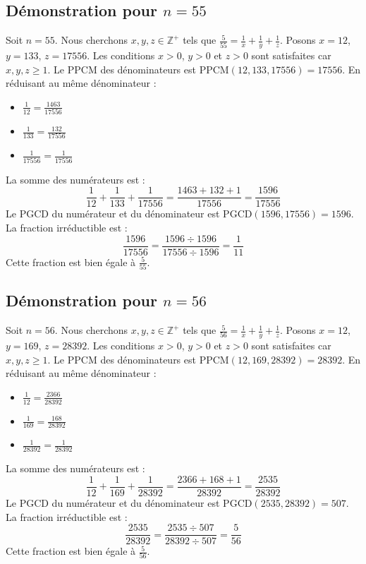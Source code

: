 \documentclass[11pt,a4paper]{article}
\begin{document}
\subsection{Démonstration pour $n = 55$}
Soit $n = 55$. Nous cherchons $x, y, z \in \mathbb{Z}^{+}$ tels que $\frac{5}{55} = \frac{1}{x} + \frac{1}{y} + \frac{1}{z}$.
Posons $x = 12$, $y = 133$, $z = 17556$.
Les conditions $x > 0$, $y > 0$ et $z > 0$ sont satisfaites car $x, y, z \geq 1$.
Le PPCM des dénominateurs est $\text{PPCM}(12, 133, 17556) = 17556$.
En réduisant au même dénominateur :
\begin{itemize}
    \item $\frac{1}{12} = \frac{1463}{17556}$
    \item $\frac{1}{133} = \frac{132}{17556}$
    \item $\frac{1}{17556} = \frac{1}{17556}$
\end{itemize}
La somme des numérateurs est :
$$ \frac{1}{12} + \frac{1}{133} + \frac{1}{17556} = \frac{1463 + 132 + 1}{17556} = \frac{1596}{17556} $$
Le PGCD du numérateur et du dénominateur est $\text{PGCD}(1596, 17556) = 1596$.
La fraction irréductible est :
$$ \frac{1596}{17556} = \frac{1596 \div 1596}{17556 \div 1596} = \frac{1}{11} $$
Cette fraction est bien égale à $\frac{5}{55}$.

\subsection{Démonstration pour $n = 56$}
Soit $n = 56$. Nous cherchons $x, y, z \in \mathbb{Z}^{+}$ tels que $\frac{5}{56} = \frac{1}{x} + \frac{1}{y} + \frac{1}{z}$.
Posons $x = 12$, $y = 169$, $z = 28392$.
Les conditions $x > 0$, $y > 0$ et $z > 0$ sont satisfaites car $x, y, z \geq 1$.
Le PPCM des dénominateurs est $\text{PPCM}(12, 169, 28392) = 28392$.
En réduisant au même dénominateur :
\begin{itemize}
    \item $\frac{1}{12} = \frac{2366}{28392}$
    \item $\frac{1}{169} = \frac{168}{28392}$
    \item $\frac{1}{28392} = \frac{1}{28392}$
\end{itemize}
La somme des numérateurs est :
$$ \frac{1}{12} + \frac{1}{169} + \frac{1}{28392} = \frac{2366 + 168 + 1}{28392} = \frac{2535}{28392} $$
Le PGCD du numérateur et du dénominateur est $\text{PGCD}(2535, 28392) = 507$.
La fraction irréductible est :
$$ \frac{2535}{28392} = \frac{2535 \div 507}{28392 \div 507} = \frac{5}{56} $$
Cette fraction est bien égale à $\frac{5}{56}$.
\end{document}

